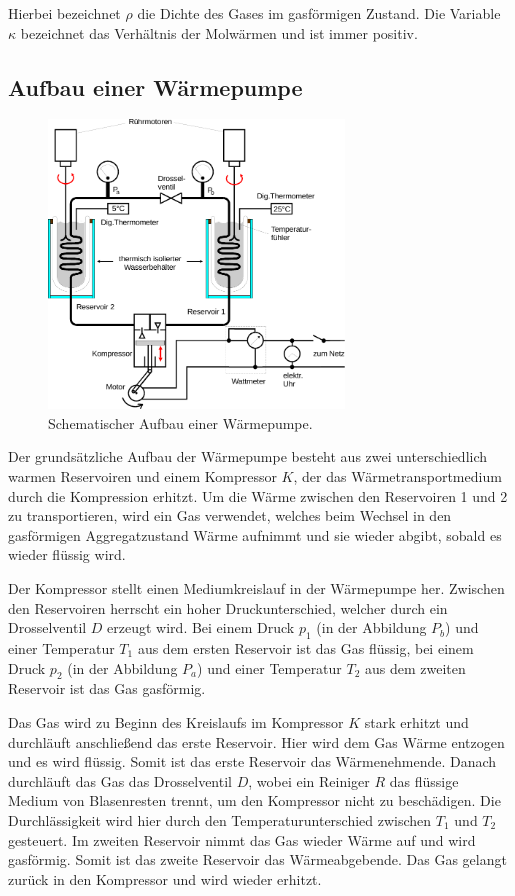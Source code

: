     Hierbei bezeichnet $\rho$ die Dichte des Gases im gasförmigen Zustand.
    Die Variable $\kappa$ bezeichnet das Verhältnis der Molwärmen und ist immer positiv.


\subsection{Aufbau einer Wärmepumpe}
\label{sec:Aufbau}

    \begin{figure}
      \centering
      \includegraphics[width=0.7\textwidth]{content/img/Abb_2.pdf}
      \caption{Schematischer Aufbau einer Wärmepumpe.}
      \label{fig:aufbau}
    \end{figure}


    Der grundsätzliche Aufbau der Wärmepumpe besteht aus zwei unterschiedlich warmen Reservoiren und einem Kompressor $K$,
    der das Wärmetransportmedium durch die Kompression erhitzt.
    Um die Wärme zwischen den Reservoiren 1 und 2 zu transportieren,
    wird ein Gas verwendet,
    welches beim Wechsel in den gasförmigen
    Aggregatzustand Wärme aufnimmt und sie wieder abgibt,
    sobald es wieder flüssig wird.

    Der Kompressor stellt einen Mediumkreislauf in der Wärmepumpe her.
    Zwischen den Reservoiren herrscht ein hoher Druckunterschied,
    welcher durch ein Drosselventil $D$ erzeugt wird.
    Bei einem Druck $p_1$ (in der Abbildung $P_b$) und einer Temperatur $T_1$ aus dem ersten Reservoir ist das Gas flüssig,
    bei einem Druck $p_2$ (in der Abbildung $P_a$) und einer Temperatur $T_2$ aus dem zweiten Reservoir ist das Gas gasförmig.

    Das Gas wird zu Beginn des Kreislaufs im Kompressor $K$ stark erhitzt und durchläuft anschließend das erste Reservoir.
    Hier wird dem Gas Wärme entzogen und es wird flüssig.
    Somit ist das erste Reservoir das Wärmenehmende.
    Danach durchläuft das Gas das Drosselventil $D$,
    wobei ein Reiniger $R$ das flüssige Medium von Blasenresten trennt,
    um den Kompressor nicht zu beschädigen.
    Die Durchlässigkeit wird hier durch den Temperaturunterschied zwischen $T_1$ und $T_2$ gesteuert.
    Im zweiten Reservoir nimmt das Gas wieder Wärme auf und wird gasförmig.
    Somit ist das zweite Reservoir das Wärmeabgebende.
    Das Gas gelangt zurück in den Kompressor und wird wieder erhitzt.
